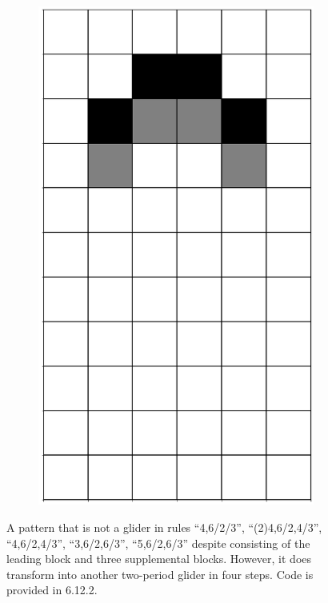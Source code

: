 \documentclass[12pt]{article}
\numberwithin{figure}{section} %
\begin{document}
\begin{figure}[H]
\begin{subfigure}{0.19\textwidth}
     \includegraphics[width=\linewidth]{Section4/2.4}
   \end{subfigure}
   \caption{A pattern that is not a glider in rules “4,6/2/3”, “(2)4,6/2,4/3”, “4,6/2,4/3”, “3,6/2,6/3”, “5,6/2,6/3” despite consisting of the leading block and three supplemental blocks. However, it does transform into another two-period glider in four steps. Code is provided in 6.12.2. }
   \vspace{-1.5em}
\end{figure}
\end{document}
